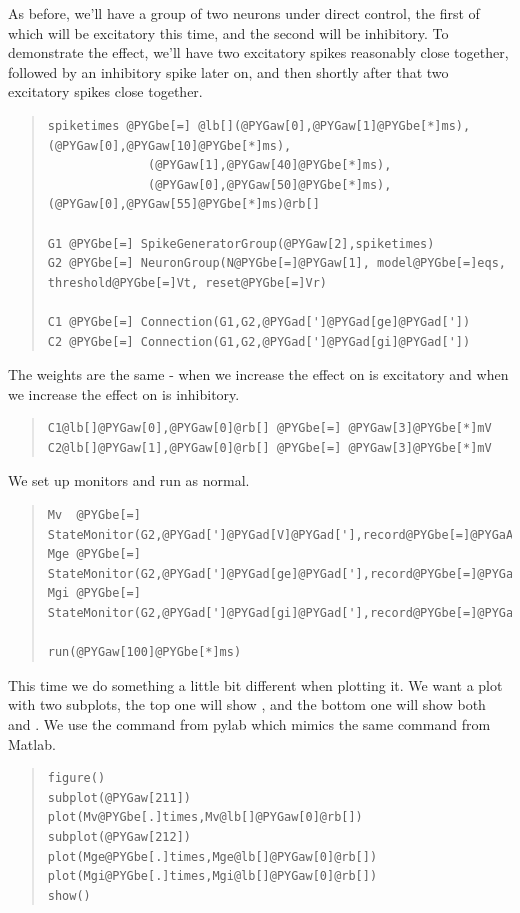 \documentclass[letterpaper,10pt,english]{manual}
\begin{document}
As before, we'll have a group of two neurons under direct control, the first
of which will be excitatory this time, and the second will be inhibitory. To
demonstrate the effect, we'll have two excitatory spikes reasonably close
together, followed by an inhibitory spike later on, and then shortly after
that two excitatory spikes close together.
\begin{quote}

\begin{Verbatim}[commandchars=@\[\]]
spiketimes @PYGbe[=] @lb[](@PYGaw[0],@PYGaw[1]@PYGbe[*]ms),(@PYGaw[0],@PYGaw[10]@PYGbe[*]ms),
              (@PYGaw[1],@PYGaw[40]@PYGbe[*]ms),
              (@PYGaw[0],@PYGaw[50]@PYGbe[*]ms),(@PYGaw[0],@PYGaw[55]@PYGbe[*]ms)@rb[]

G1 @PYGbe[=] SpikeGeneratorGroup(@PYGaw[2],spiketimes)
G2 @PYGbe[=] NeuronGroup(N@PYGbe[=]@PYGaw[1], model@PYGbe[=]eqs, threshold@PYGbe[=]Vt, reset@PYGbe[=]Vr)

C1 @PYGbe[=] Connection(G1,G2,@PYGad[']@PYGad[ge]@PYGad['])
C2 @PYGbe[=] Connection(G1,G2,@PYGad[']@PYGad[gi]@PYGad['])
\end{Verbatim}
\end{quote}

The weights are the same - when we increase  the effect on  is excitatory
and when we increase  the effect on  is inhibitory.
\begin{quote}

\begin{Verbatim}[commandchars=@\[\]]
C1@lb[]@PYGaw[0],@PYGaw[0]@rb[] @PYGbe[=] @PYGaw[3]@PYGbe[*]mV
C2@lb[]@PYGaw[1],@PYGaw[0]@rb[] @PYGbe[=] @PYGaw[3]@PYGbe[*]mV
\end{Verbatim}
\end{quote}

We set up monitors and run as normal.
\begin{quote}

\begin{Verbatim}[commandchars=@\[\]]
Mv  @PYGbe[=] StateMonitor(G2,@PYGad[']@PYGad[V]@PYGad['],record@PYGbe[=]@PYGaA[True])
Mge @PYGbe[=] StateMonitor(G2,@PYGad[']@PYGad[ge]@PYGad['],record@PYGbe[=]@PYGaA[True])
Mgi @PYGbe[=] StateMonitor(G2,@PYGad[']@PYGad[gi]@PYGad['],record@PYGbe[=]@PYGaA[True])

run(@PYGaw[100]@PYGbe[*]ms)
\end{Verbatim}
\end{quote}

This time we do something a little bit different when plotting it. We want
a plot with two subplots, the top one will show , and the bottom one will
show both  and . We use the  command from pylab which mimics the
same command from Matlab.
\begin{quote}

\begin{Verbatim}[commandchars=@\[\]]
figure()
subplot(@PYGaw[211])
plot(Mv@PYGbe[.]times,Mv@lb[]@PYGaw[0]@rb[])
subplot(@PYGaw[212])
plot(Mge@PYGbe[.]times,Mge@lb[]@PYGaw[0]@rb[])
plot(Mgi@PYGbe[.]times,Mgi@lb[]@PYGaw[0]@rb[])
show()
\end{Verbatim}
\end{quote}
\end{document}
